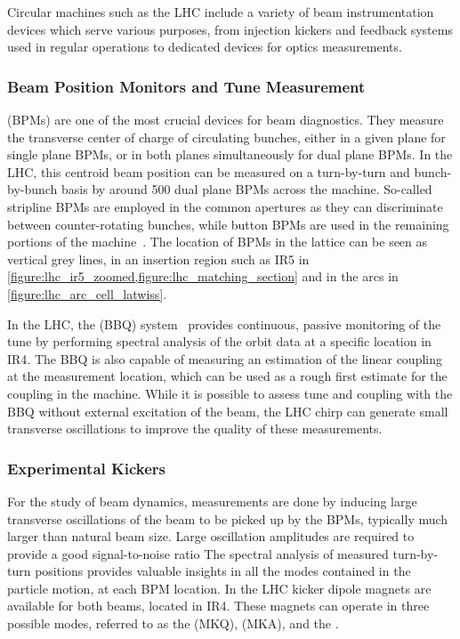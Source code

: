 Circular machines such as the LHC include a variety of beam instrumentation devices which serve various purposes, from injection kickers and feedback systems used in regular operations to dedicated devices for optics measurements.

\subsubsection*{Beam Position Monitors and Tune Measurement}

 (BPMs) are one of the most crucial devices for beam diagnostics.
They measure the transverse center of charge of circulating bunches, either in a given plane for single plane BPMs, or in both planes simultaneously for dual plane BPMs.
In the LHC, this centroid beam position can be measured on a turn-by-turn and bunch-by-bunch basis by around \num{500} dual plane BPMs across the machine.
So-called stripline BPMs are employed in the common apertures as they can discriminate between counter-rotating bunches, while button BPMs are used in the remaining portions of the machine~\cite{BOOK:Bruning:LHC_Design_Report_Main_Ring}. 
The location of BPMs in the lattice can be seen as vertical grey lines, in an insertion region such as IR\num{5} in \cref{figure:lhc_ir5_zoomed,figure:lhc_matching_section} and in the arcs in \cref{figure:lhc_arc_cell_latwiss}.

In the LHC, the  (BBQ) system~\cite{CERN:Boccardi:LHC_Transverse_Diagnostics_Systems,CERN:Boccardi:LHC_BBQ_Tune_Chromaticity_Systems} provides continuous, passive monitoring of the tune by performing spectral analysis of the orbit data at a specific location in IR\num{4}.
The BBQ is also capable of measuring an estimation of the linear coupling at the measurement location, which can be used as a rough first estimate for the coupling in the machine.
While it is possible to assess tune and coupling with the BBQ without external excitation of the beam, the LHC chirp can generate small transverse oscillations to improve the quality of these measurements.

\subsubsection*{Experimental Kickers}

For the study of beam dynamics, measurements are done by inducing large transverse oscillations of the beam to be picked up by the BPMs, typically much larger than natural beam size. 
Large oscillation amplitudes are required to provide a good signal-to-noise ratio 
The spectral analysis of measured turn-by-turn positions provides valuable insights in all the modes contained in the particle motion, at each BPM location.
In the LHC kicker dipole magnets are available for both beams, located in IR\num{4}.
These magnets can operate in three possible modes, referred to as the  (MKQ),  (MKA), and the .

